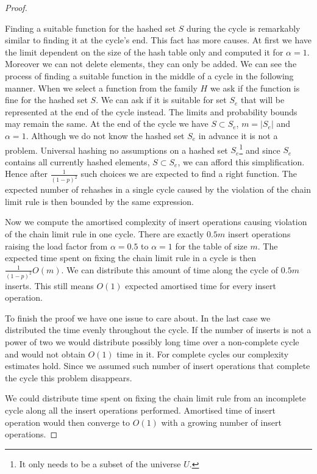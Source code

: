 \begin{proof}
\begin{itemize}
Finding a suitable function for the hashed set $S$ during the cycle is remarkably similar to finding it at the cycle's end. This fact has more causes. At first we have the limit dependent on the size of the hash table only and computed it for $\alpha = 1$. Moreover we can not delete elements, they can only be added. We can see the process of finding a suitable function in the middle of a cycle in the following manner. When we select a function from the family $H$ we ask if the function is fine for the hashed set $S$. We can ask if it is suitable for set $S_e$ that will be represented at the end of the cycle instead. The limits and probability bounds may remain the same. At the end of the cycle we have $S \subset S_e$, $m = |S_e|$ and $\alpha = 1$. Although we do not know the hashed set $S_e$ in advance it is not a problem. Universal hashing  no assumptions on a hashed set $S_e$\footnote{It only needs to be a subset of the universe $U$.} and since $S_e$ contains all currently hashed elements, $S \subset S_e$, we can afford this simplification. Hence after $\frac{1}{(1-p)^2}$ such choices we are expected to find a right function. The expected number of rehashes in a single cycle caused by the violation of the chain limit rule is then bounded by the same expression. 

Now we compute the amortised complexity of insert operations causing violation of the chain limit rule in one cycle. There are exactly $0.5 m$ insert operations raising the load factor from $\alpha = 0.5$ to $\alpha = 1$ for the table of size $m$. The expected time spent on fixing the chain limit rule in a cycle is then $\frac{1}{(1 - p)^2}O(m)$. We can distribute this amount of time along the cycle of $0.5 m$ inserts. This still means $O(1)$ expected amortised time for every insert operation.
\end{itemize}

To finish the proof we have one issue to care about. In the last case we distributed the time evenly throughout the cycle. If the number of inserts is not a power of two we would distribute possibly long time over a non-complete cycle and would not obtain $O(1)$ time in it. For complete cycles our complexity estimates hold. Since we assumed such number of insert operations that complete the cycle this problem disappears.

We could distribute time spent on fixing the chain limit rule from an incomplete cycle along all the insert operations performed. Amortised time of insert operation would then converge to $O(1)$ with a growing number of insert operations.
\end{proof}


